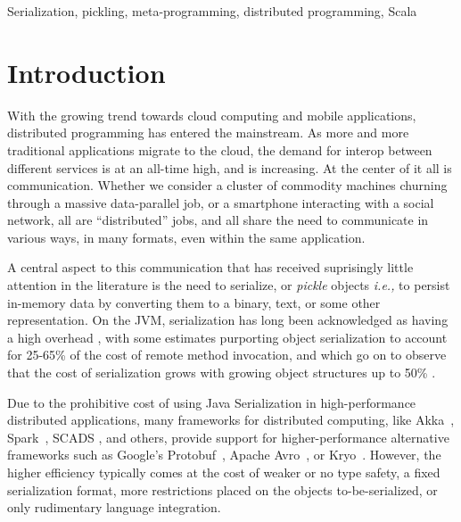 \documentclass[preprint,10pt]{sigplanconf}
\theoremstyle{definition}
\theoremstyle{definition}
\begin{document}


\keywords
Serialization, pickling, meta-programming, distributed programming, Scala

\section{Introduction}

With the growing trend towards cloud computing and mobile applications,
distributed programming has entered the mainstream. As more and more
traditional applications migrate to the cloud, the demand for interop between
different services is at an all-time high, and is increasing. At the center of
it all is communication. Whether we consider a cluster of commodity machines
churning through a massive data-parallel job, or a smartphone interacting with
a social network, all are ``distributed'' jobs, and all share the need to
communicate in various ways, in many formats, even within the same
application.

A central aspect to this communication that has received suprisingly little
attention in the literature is the need to serialize, or {\em pickle} objects
{\em i.e.,} to persist in-memory data by converting them to a binary, text, or
some other representation. On the JVM, serialization has long been
acknowledged as having a high overhead \cite{Welsh2000, Carpenter1999}, with
some estimates purporting object serialization to account for 25-65\% of the
cost of remote method invocation, and which go on to observe that the cost of
serialization grows with growing object structures up to 50\%
\cite{Philippsen2000, Maassen1999}.

Due to the prohibitive cost of using Java Serialization in high-performance
distributed applications, many frameworks for distributed computing, like
Akka~\cite{Akka}, Spark~\cite{Zaharia2012}, SCADS \cite{Armbrust2009}, and
others, provide support for higher-performance alternative frameworks such as
Google's Protobuf~\cite{Protobuf}, Apache Avro~\cite{Avro}, or
Kryo~\cite{Kryo}. However, the higher efficiency typically comes at the cost
of weaker or no type safety, a fixed serialization format, more restrictions
placed on the objects to-be-serialized, or only rudimentary language
integration.
\end{document}
